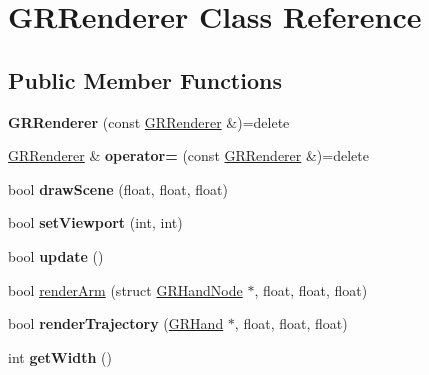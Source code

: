\hypertarget{classGRRenderer}{}\section{G\+R\+Renderer Class Reference}
\label{classGRRenderer}
\subsection*{Public Member Functions}
\begin{DoxyCompactItemize}
\item 
\mbox{\label{classGRRenderer_a4f7c9cb0d98cf3669f578b51cd381b6b}} 
{\bfseries G\+R\+Renderer} (const \mbox{\hyperlink{classGRRenderer}{G\+R\+Renderer}} \&)=delete
\item 
\mbox{\label{classGRRenderer_aa82eaa735fa00c5767dff5efda99e7c9}} 
\mbox{\hyperlink{classGRRenderer}{G\+R\+Renderer}} \& {\bfseries operator=} (const \mbox{\hyperlink{classGRRenderer}{G\+R\+Renderer}} \&)=delete
\item 
\mbox{\label{classGRRenderer_ad029322975174c8a281fc81fd81a79b1}} 
bool {\bfseries draw\+Scene} (float, float, float)
\item 
\mbox{\label{classGRRenderer_a8954384d0ca99754243a2b5e974413eb}} 
bool {\bfseries set\+Viewport} (int, int)
\item 
\mbox{\label{classGRRenderer_a498b5521a2e2193986cd635f3d7c8338}} 
bool {\bfseries update} ()
\item 
bool \mbox{\hyperlink{classGRRenderer_ad46d080a958497f815600edf60dee906}{render\+Arm}} (struct \mbox{\hyperlink{structGRHandNode}{G\+R\+Hand\+Node}} $\ast$, float, float, float)
\item 
\mbox{\label{classGRRenderer_a0f1ff011fec65f15698946efdcb21d9b}} 
bool {\bfseries render\+Trajectory} (\mbox{\hyperlink{classGRHand}{G\+R\+Hand}} $\ast$, float, float, float)
\item 
\mbox{\label{classGRRenderer_adf8af5e57e6c45a9054d8143a189dce6}} 
int {\bfseries get\+Width} ()
\item 
\mbox{\label{classGRRenderer_a7eff97767b489645255548347b67ead5}} 

\end{DoxyCompactItemize}
